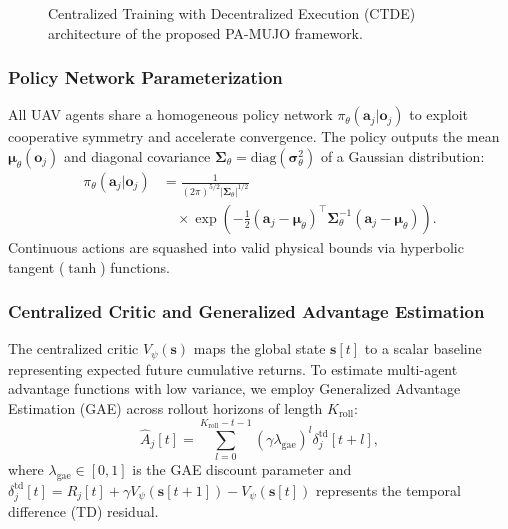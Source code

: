 \documentclass[journal]{IEEEtran}
\begin{document}
\begin{figure}[!ht]
{%
  }
  \caption{Centralized Training with Decentralized Execution (CTDE) architecture of the proposed PA-MUJO framework.}
  \label{fig:mappo_flowchart}
\end{figure}

\subsubsection{Policy Network Parameterization}
All UAV agents share a homogeneous policy network $\pi_\theta(\mathbf{a}_j | \mathbf{o}_j)$ to exploit cooperative symmetry and accelerate convergence. The policy outputs the mean $\boldsymbol{\mu}_\theta(\mathbf{o}_j)$ and diagonal covariance $\boldsymbol{\Sigma}_\theta = \mathrm{diag}(\boldsymbol{\sigma}_\theta^2)$ of a Gaussian distribution:
\begin{equation}
\begin{aligned}
    \pi_\theta(\mathbf{a}_j | \mathbf{o}_j)
    &= \frac{1}{(2\pi)^{5/2} |\boldsymbol{\Sigma}_\theta|^{1/2}} \\
    &\quad \times \exp\left(-\frac{1}{2}(\mathbf{a}_j - \boldsymbol{\mu}_\theta)^\top
    \boldsymbol{\Sigma}_\theta^{-1} (\mathbf{a}_j - \boldsymbol{\mu}_\theta)\right).
\end{aligned}
\end{equation}
Continuous actions are squashed into valid physical bounds via hyperbolic tangent ($\tanh$) functions.

\subsubsection{Centralized Critic and Generalized Advantage Estimation}
The centralized critic $V_\psi(\mathbf{s})$ maps the global state $\mathbf{s}[t]$ to a scalar baseline representing expected future cumulative returns. To estimate multi-agent advantage functions with low variance, we employ Generalized Advantage Estimation (GAE) across rollout horizons of length $K_{\mathrm{roll}}$:
\begin{equation}
    \hat{A}_j[t] = \sum_{l=0}^{K_{\mathrm{roll}} - t - 1} (\gamma \lambda_{\mathrm{gae}})^l \delta_j^{\mathrm{td}}[t+l],
    \label{eq:gae_formula}
\end{equation}
where $\lambda_{\mathrm{gae}} \in [0, 1]$ is the GAE discount parameter and $\delta_j^{\mathrm{td}}[t] = R_j[t] + \gamma V_\psi(\mathbf{s}[t+1]) - V_\psi(\mathbf{s}[t])$ represents the temporal difference (TD) residual.
\end{document}
